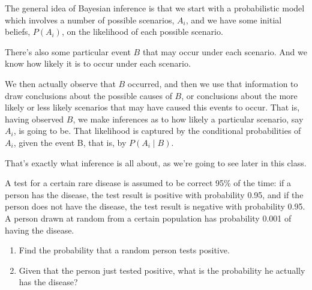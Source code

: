 \documentclass{tufte-handout}
\begin{document}
The
general idea of Bayesian inference is that we start with a probabilistic model which involves a number of possible scenarios, $A_i$,
and we have some initial beliefs, $P(A_i)$, on the likelihood of each possible scenario. 

There's also some particular event $B$ that may occur under each scenario. And we know how likely it is to
occur under each scenario. 

We then actually observe that $B$ occurred, and then we use that
information to draw conclusions about the possible causes of $B$, or conclusions about the more likely or
less likely scenarios that may have caused this events to occur. That is, having observed $B$, we make inferences as to 
how likely a particular scenario, say $A_i$, is going to be. That likelihood is captured by the conditional probabilities of $A_i$, 
given the event B, that is, by $P(A_i \mid B)$. 


That's exactly what inference is all about, as we're going to see later in this class.


 A test for a certain rare disease is assumed to be correct 95\% 
of the time: if a person has the disease, the test result is positive with probability 0.95, and if the person does not 
have the disease, the test result is negative with probability 0.95. A person drawn at random from a certain population 
has probability 0.001 of having the disease.



\begin{enumerate}
\item Find the probability that a random person tests positive.
\item Given that the person just tested positive, what is the probability he actually has the disease?
\end{enumerate}



\vspace{3mm}
\end{document}
